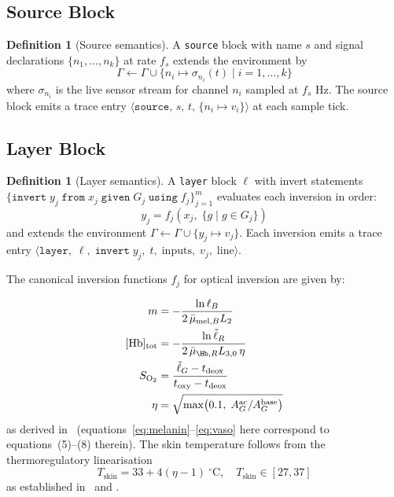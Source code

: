 \documentclass[10pt,twocolumn,a4paper]{article}
\theoremstyle{definition}
\newtheorem{definition}[theorem]{Definition}
\theoremstyle{remark}
\newcommand{\vaso}{\eta}
\newcommand{\melan}{m}
\newcommand{\Hbconc}{[\mathrm{Hb}]_{\mathrm{tot}}}
\newcommand{\Soxy}{S_{\mathrm{O_2}}}
\begin{document}
\subsection{Source Block}

\begin{definition}[Source semantics]
\label{def:source}
A \texttt{source} block with name $s$ and signal declarations
$\{n_1,\ldots,n_k\}$ at rate $f_s$ extends the environment by
\[
  \Gamma \leftarrow \Gamma \cup \{n_i \mapsto \sigma_{n_i}(t) \mid i=1,\ldots,k\}
\]
where $\sigma_{n_i}$ is the live sensor stream for channel $n_i$ sampled
at $f_s$ Hz.  The source block emits a trace entry
$\langle\texttt{source},\, s,\, t,\, \{n_i \mapsto v_i\}\rangle$
at each sample tick.
\end{definition}

\subsection{Layer Block}

\begin{definition}[Layer semantics]
\label{def:layer}
A \texttt{layer} block $\ell$ with invert statements
$\{\texttt{invert}\; y_j\; \texttt{from}\; x_j\; \texttt{given}\;
G_j\; \texttt{using}\; f_j\}_{j=1}^{m}$
evaluates each inversion in order:
\[
  y_j = f_j\!\left(x_j,\; \{g \mid g \in G_j\}\right)
\]
and extends the environment $\Gamma \leftarrow \Gamma \cup \{y_j \mapsto v_j\}$.
Each inversion emits a trace entry
$\langle\texttt{layer},\;\ell,\;\texttt{invert}\;y_j,\;t,\;\mathrm{inputs},\;v_j,\;\mathrm{line}\rangle$.
\end{definition}

The canonical inversion functions $f_j$ for optical inversion are given by:

\begin{align}
\melan &= -\frac{\ln \ell_B}{2\,\bar\mu_{\mathrm{mel},B} L_2}
\label{eq:melanin} \\
\Hbconc &= -\frac{\ln \tilde\ell_R}{2\,\bar\mu_{\Hb,R} L_{3,0}\,\vaso}
\label{eq:hbconc} \\
\Soxy &= \frac{\tilde\ell_G - t_{\mathrm{deox}}}{t_{\mathrm{oxy}} - t_{\mathrm{deox}}}
\label{eq:spo2} \\
\vaso &= \sqrt{\max\!\left(0.1,\; A^{\mathrm{ac}}_G / A^{\mathrm{base}}_G\right)}
\label{eq:vaso}
\end{align}
as derived in~\cite{sachikonye2024optical}
(equations~\ref{eq:melanin}--\ref{eq:vaso} here correspond to
equations~(5)--(8) therein).  The skin temperature follows from the
thermoregulatory linearisation
\begin{equation}
T_{\mathrm{skin}} = 33 + 4(\vaso - 1)\ {}^{\circ}\mathrm{C},
\quad T_{\mathrm{skin}} \in [27,37]
\label{eq:tskin}
\end{equation}
as established in~\cite{sachikonye2024optical} and
\cite{sachikonye2024disambiguation}.
\end{document}
